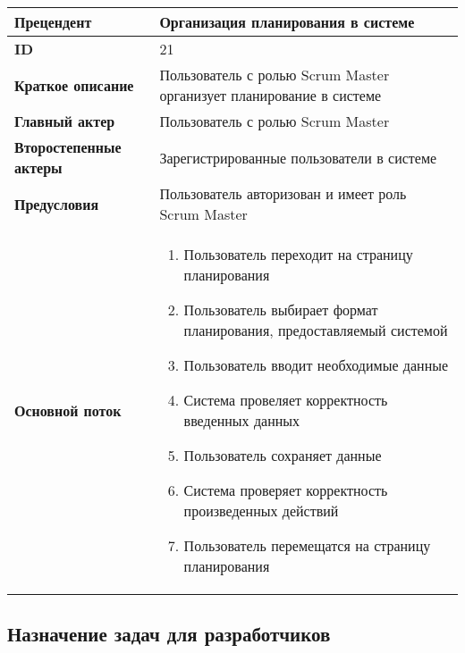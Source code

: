 \documentclass[14pt,a4paper]{extarticle}
\begin{document}
\begin{tabular}{|l|p{9cm}|}
	\hline
	\textbf{Прецендент}            & Организация планирования в системе                                       \\
	\hline
	\textbf{ID}                    & 21                                                                       \\
	\hline
	\textbf{Краткое описание}      & Пользователь с ролью Scrum Master организует планирование в системе      \\
	\hline
	\textbf{Главный актер}         & Пользователь с ролью Scrum Master                                        \\
	\hline
	\textbf{Второстепенные актеры} & Зарегистрированные пользователи в системе                                \\
	\hline
	\textbf{Предусловия}           & Пользователь авторизован и имеет роль Scrum Master                       \\
	\hline
	\textbf{Основной поток}        & \begin{enumerate}
		                                 \item Пользователь переходит на страницу планирования
		                                 \item Пользователь выбирает формат планирования, предоставляемый системой
		                                 \item Пользователь вводит необходимые данные
		                                 \item Система провеляет корректность введенных данных
		                                 \item Пользователь сохраняет данные
		                                 \item Система проверяет корректность произведенных действий
		                                 \item Пользователь перемещатся на страницу планирования
	                                 \end{enumerate} \\
	\hline
\end{tabular}

\subsection{Назначение задач для разработчиков}
\end{document}

